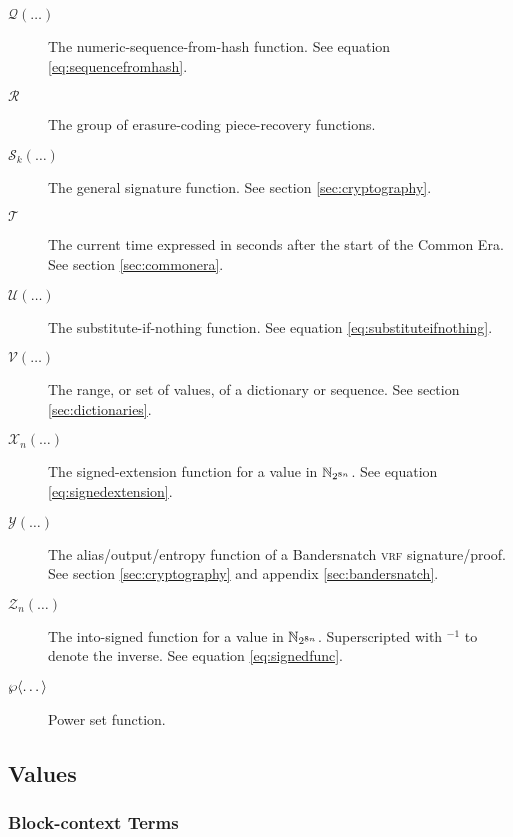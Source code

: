 \begin{description}
  \item[$\mathcal{Q}(\dots)$] The numeric-sequence-from-hash function. See equation \ref{eq:sequencefromhash}.
  \item[$\mathcal{R}$] The group of erasure-coding piece-recovery functions.
  \item[$\mathcal{S}_k(\dots)$] The general signature function. See section \ref{sec:cryptography}.
  \item[$\mathcal{T}$] The current time expressed in seconds after the start of the \Jam Common Era. See section \ref{sec:commonera}.
  \item[$\mathcal{U}(\dots)$] The substitute-if-nothing function. See equation \ref{eq:substituteifnothing}.
  \item[$\mathcal{V}(\dots)$] The range, or set of values, of a dictionary or sequence. See section \ref{sec:dictionaries}.
  \item[$\mathcal{X}_n(\dots)$] The signed-extension function for a value in $\mathbb{N}_{2^{8n}}$. See equation \ref{eq:signedextension}.
  \item[$\mathcal{Y}(\dots)$] The alias/output/entropy function of a Bandersnatch \textsc{vrf} signature/proof. See section \ref{sec:cryptography} and appendix \ref{sec:bandersnatch}.
  \item[$\mathcal{Z}_n(\dots)$] The into-signed function for a value in $\mathbb{N}_{2^{8n}}$. Superscripted with ${}^{-1}$ to denote the inverse. See equation \ref{eq:signedfunc}.
  \item[$\powset{\dots}$] Power set function.
\end{description}

\subsection{Values}

\subsubsection{Block-context Terms}

